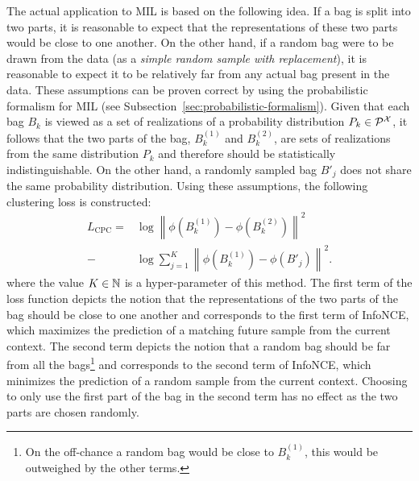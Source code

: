 The actual application to MIL is based on the following idea. If a bag is split into two parts, it is reasonable to expect that the representations of these two parts would be close to one another. On the other hand, if a random bag were to be drawn from the data (as a \textit{simple random sample with replacement}), it is reasonable to expect it to be relatively far from any actual bag present in the data. These assumptions can be proven correct by using the probabilistic formalism for MIL (see Subsection~\ref{sec:probabilistic-formalism}). Given that each bag \( B_k \) is viewed as a set of realizations of a probability distribution \( P_k \in \mathcal{P}^\mathspace{X} \), it follows that the two parts of the bag, \( B_k^{(1)} \) and \( B_k^{(2)} \), are sets of realizations from the same distribution \( P_k \) and therefore should be statistically indistinguishable. On the other hand, a randomly sampled bag \( B'_j \) does not share the same probability distribution.
Using these assumptions, the following clustering loss is constructed:
\begin{align*}
	L_\mathrm{CPC} = &\log \left\lVert \phi \left( B_k^{(1)} \right) - \phi \left( B_k^{(2)} \right) \right\rVert^2 \\
	- &\log \sum_{j = 1}^K \left\lVert \phi \left( B_k^{(1)} \right) - \phi \left( B'_j \right) \right\rVert^2.
\end{align*}
where the value \( K \in \mathbb{N} \) is a hyper-parameter of this method. The first term of the loss function depicts the notion that the representations of the two parts of the bag should be close to one another and corresponds to the first term of InfoNCE, which maximizes the prediction of a matching future sample from the current context. The second term depicts the notion that a random bag should be far from all the bags\footnote{On the off-chance a random bag would be close to \( B_k^{(1)} \), this would be outweighed by the other terms.} and corresponds to the second term of InfoNCE, which minimizes the prediction of a random sample from the current context. Choosing to only use the first part of the bag in the second term has no effect as the two parts are chosen randomly.

